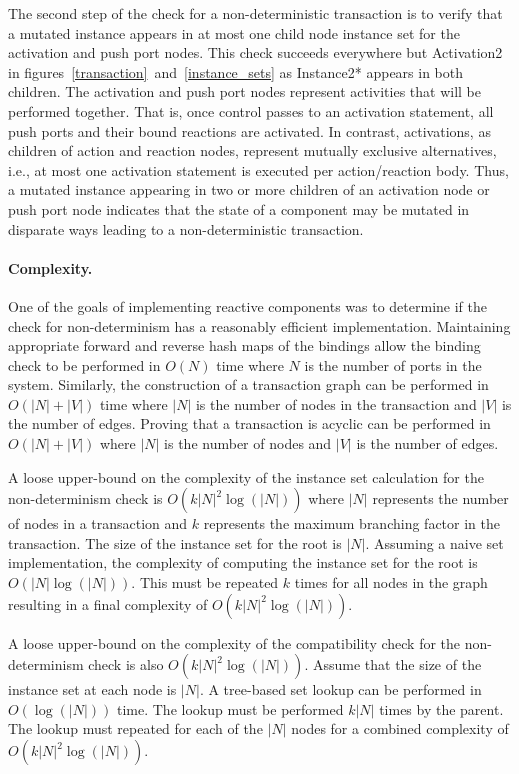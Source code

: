 The second step of the check for a non-deterministic transaction is to verify that a mutated instance appears in at most one child node instance set for the activation and push port nodes.
This check succeeds everywhere but Activation2 in figures~\ref{transaction}~and~\ref{instance_sets} as Instance2* appears in both children.
The activation and push port nodes represent activities that will be performed together.
That is, once control passes to an activation statement, all push ports and their bound reactions are activated.
In contrast, activations, as children of action and reaction nodes, represent mutually exclusive alternatives, i.e., at most one activation statement is executed per action/reaction body.
Thus, a mutated instance appearing in two or more children of an activation node or push port node indicates that the state of a component may be mutated in disparate ways leading to a non-deterministic transaction.

\paragraph{Complexity.}
One of the goals of implementing reactive components was to determine if the check for non-determinism has a reasonably efficient implementation.
Maintaining appropriate forward and reverse hash maps of the bindings allow the binding check to be performed in $O(N)$ time where $N$ is the number of ports in the system.
Similarly, the construction of a transaction graph can be performed in $O(|N| + |V|)$ time where $|N|$ is the number of nodes in the transaction and $|V|$ is the number of edges.
Proving that a transaction is acyclic can be performed in $O(|N| + |V|)$ where $|N|$ is the number of nodes and $|V|$ is the number of edges.

A loose upper-bound on the complexity of the instance set calculation for the non-determinism check is $O(k |N|^2 \log (|N|))$ where $|N|$ represents the number of nodes in a transaction and $k$ represents the maximum branching factor in the transaction.
The size of the instance set for the root is $|N|$.
Assuming a naive set implementation, the complexity of computing the instance set for the root is $O(|N| \log (|N|))$.
This must be repeated $k$ times for all nodes in the graph resulting in a final complexity of $O(k |N|^2 \log (|N|))$.

A loose upper-bound on the complexity of the compatibility check for the non-determinism check is also $O(k |N|^2 \log (|N|))$.
Assume that the size of the instance set at each node is $|N|$.
A tree-based set lookup can be performed in $O(\log(|N|))$ time.
The lookup must be performed $k |N|$ times by the parent.
The lookup must repeated for each of the $|N|$ nodes for a combined complexity of $O(k |N|^2 \log (|N|))$.

